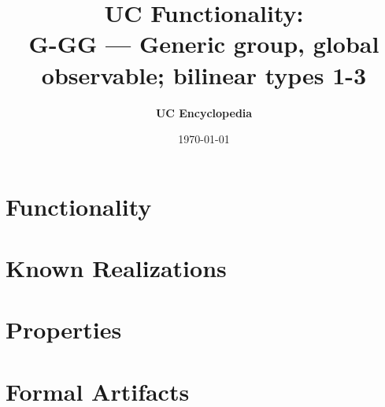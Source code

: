 \documentclass[11pt,a4paper]{article}
\title{\textbf{\Large UC Functionality:}\\[0.2em] \Large G-GG --- Generic group, global observable; bilinear types 1-3}
\author{\textbf{UC Encyclopedia}}
\date{\today}
\newtheorem{functionality}{Functionality}
\begin{document}
\maketitle

\begin{abstract}
\end{abstract}

\section{Functionality}

%

\section{Known Realizations}


\section{Properties}


\section{Formal Artifacts}

\end{document}
